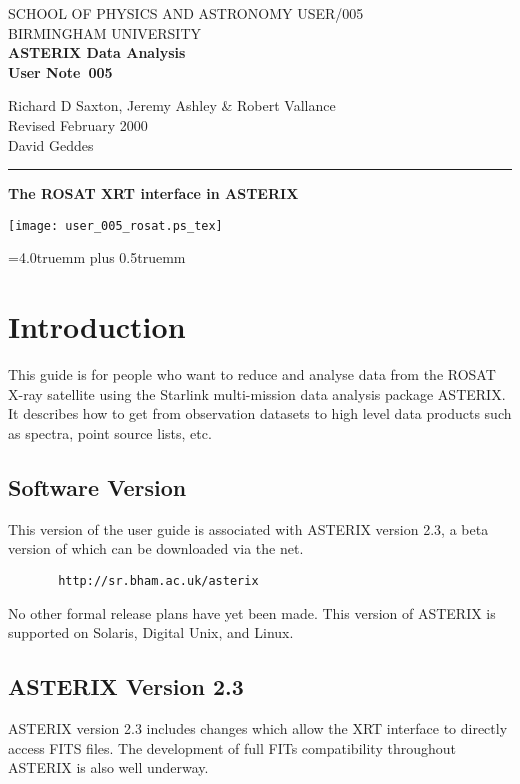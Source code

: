 \documentclass[11pt,fleqn]{article}    %
\newcommand{\stardoccategory}  {User Note}
\newcommand{\stardocinitials}  {USER}
\newcommand{\stardocnumber}    {005}
\newcommand{\stardocauthors}   {Richard D Saxton, Jeremy Ashley \& Robert Vallance}
\newcommand{\stardocdate}      {Revised February 2000\\David Geddes}
\newcommand{\stardoctitle}     {The ROSAT XRT interface in ASTERIX}
\newcommand{\stardocname}      {\stardocinitials /\stardocnumber}
\newcommand{\docpicture} {\texttt{[image: user\_005\_rosat.ps\_tex]}}
\begin{document}
\thispagestyle{empty}
SCHOOL OF PHYSICS AND ASTRONOMY \hfill \stardocname\\
BIRMINGHAM UNIVERSITY\\
{\large\bf ASTERIX Data Analysis\\}
{\large\bf \stardoccategory\ \stardocnumber}
\begin{flushright}
\stardocauthors\\
\stardocdate
\end{flushright}
\vspace{-4mm}
\rule{\textwidth}{0.5mm}
\vspace{5mm}
\begin{center}
{\Large\bf \stardoctitle}
\end{center}
\vspace{5mm}
\begin{center}
\docpicture                             %
\end{center}
\parskip=4.0truemm plus 0.5truemm       %
\markright{\stardocname}

\newpage
\tableofcontents

\newpage

\section{Introduction}
This guide is for people who want to reduce and analyse data from the ROSAT
X-ray satellite using the Starlink multi-mission data analysis package
ASTERIX. It describes how to get from observation datasets to high level
data products such as spectra, point source lists, etc.

\subsection{Software Version}
This version of  the user guide is  associated with ASTERIX version 2.3, a
beta version of which can be downloaded via the net.  

\begin{verbatim}
       http://sr.bham.ac.uk/asterix
\end{verbatim}

No other formal release plans have yet been made.   This version of ASTERIX
is supported on Solaris, Digital Unix, and Linux.

\subsection{ASTERIX Version 2.3}
ASTERIX version 2.3   includes changes which   allow the XRT   interface to
directly   access  FITS files.  The development   of full FITs compatibility
throughout ASTERIX is also well underway.
\end{document}
